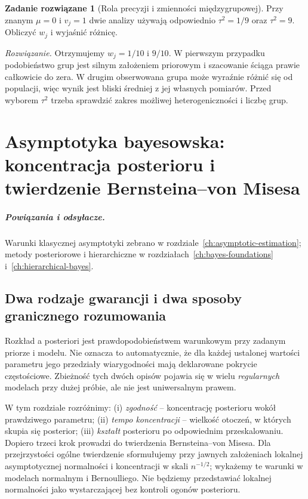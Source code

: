 \documentclass[11pt,a4paper,oneside]{report}
\numberwithin{equation}{chapter}
\theoremstyle{plain}
\theoremstyle{definition}
\newtheorem{zadanie}{Zadanie rozwiązane}[chapter]
\theoremstyle{remark}
\begin{document}
\begin{zadanie}[Rola precyzji i zmienności międzygrupowej]
Przy znanym $\mu=0$ i $v_j=1$ dwie analizy używają
odpowiednio $\tau^2=1/9$ oraz $\tau^2=9$.
Obliczyć $w_j$ i wyjaśnić różnicę.
\par\emph{Rozwiązanie.} Otrzymujemy $w_j=1/10$ i $9/10$.
W pierwszym przypadku podobieństwo grup jest silnym
założeniem priorowym i szacowanie ściąga prawie całkowicie
do zera. W drugim obserwowana grupa może wyraźnie
różnić się od populacji, więc wynik jest bliski średniej
z jej własnych pomiarów. Przed wyborem $\tau^2$ trzeba
sprawdzić zakres możliwej heterogeniczności i liczbę grup.
\end{zadanie}

\chapter{Asymptotyka bayesowska: koncentracja posterioru i twierdzenie Bernsteina--von Misesa}
\label{ch:bayesian-asymptotics}
\paragraph{Powiązania i odsyłacze.} Warunki klasycznej asymptotyki zebrano w rozdziale~\ref{ch:asymptotic-estimation}; metody posteriorowe i hierarchiczne w rozdziałach~\ref{ch:bayes-foundations} i~\ref{ch:hierarchical-bayes}.


\section{Dwa rodzaje gwarancji i dwa sposoby granicznego rozumowania}
Rozkład a posteriori jest prawdopodobieństwem warunkowym przy
zadanym priorze i modelu. Nie oznacza to automatycznie, że dla
każdej ustalonej wartości parametru jego przedziały wiarygodności
mają deklarowane pokrycie częstościowe. Zbieżność tych dwóch
opisów pojawia się w wielu \emph{regularnych} modelach przy dużej
próbie, ale nie jest uniwersalnym prawem.

W tym rozdziale rozróżnimy: (i) \emph{zgodność} -- koncentrację
posterioru wokół prawdziwego parametru; (ii) \emph{tempo koncentracji}
-- wielkość otoczeń, w których skupia się posterior;
(iii) \emph{kształt} posterioru po odpowiednim przeskalowaniu.
Dopiero trzeci krok prowadzi do twierdzenia Bernsteina--von Misesa.
Dla przejrzystości ogólne twierdzenie sformułujemy przy jawnych
założeniach lokalnej asymptotycznej normalności i koncentracji
w skali $n^{-1/2}$; wykażemy te warunki w modelach normalnym
i Bernoulliego. Nie będziemy przedstawiać lokalnej normalności
jako wystarczającej bez kontroli ogonów posterioru.
\end{document}
